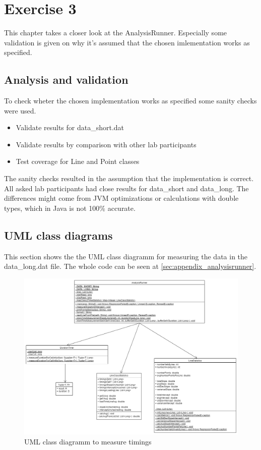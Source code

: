 \chapter{Exercise 3}
\label{chap:3}
This chapter takes a closer look at the AnalysisRunner. Especially some validation is given on why it's assumed that the chosen imlementation works as specified.

\section{Analysis and validation}
To check wheter the chosen implementation works as specified some sanity checks were used.
\begin{itemize}
    \item Validate results for data\_short.dat
    \item Validate results by comparison with other lab participants
    \item Test coverage for Line and Point classes
\end{itemize}

The sanity checks resulted in the assumption that the implementation is correct. All asked lab participants had close results for data\_short and data\_long. The differences might come from JVM optimizations or calculations with double types, which in Java is not 100\% accurate. 

\section{UML class diagrams}
\label{sec:class_diagram}
This section shows the the UML class diagramm for measuring the data in the data\_long.dat file. The whole code can be seen at \ref{sec:appendix_analysisrunner}.

\begin{landscape}
    \begin{figure}
        \begin{center}
            \includegraphics[width=1.60\textwidth]{img/classdiagram.png}
            \caption{UML class diagramm to measure timings}
        \end{center}
    \end{figure}
\end{landscape}

